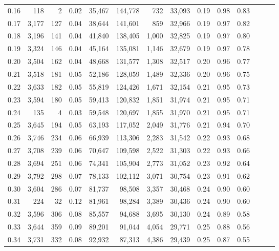 \begin{tabular}{rrrrrrrrrrrrrr}
0.16 &    118 &      2 &  0.02 &   35,467 &  144,778 &     732 &  33,093 &  0.19 &  0.98 &      0.83 \\
0.17 &  3,177 &    127 &  0.04 &   38,644 &  141,601 &     859 &  32,966 &  0.19 &  0.97 &      0.82 \\
0.18 &  3,196 &    141 &  0.04 &   41,840 &  138,405 &   1,000 &  32,825 &  0.19 &  0.97 &      0.80 \\
0.19 &  3,324 &    146 &  0.04 &   45,164 &  135,081 &   1,146 &  32,679 &  0.19 &  0.97 &      0.78 \\
0.20 &  3,504 &    162 &  0.04 &   48,668 &  131,577 &   1,308 &  32,517 &  0.20 &  0.96 &      0.77 \\
0.21 &  3,518 &    181 &  0.05 &   52,186 &  128,059 &   1,489 &  32,336 &  0.20 &  0.96 &      0.75 \\
0.22 &  3,633 &    182 &  0.05 &   55,819 &  124,426 &   1,671 &  32,154 &  0.21 &  0.95 &      0.73 \\
0.23 &  3,594 &    180 &  0.05 &   59,413 &  120,832 &   1,851 &  31,974 &  0.21 &  0.95 &      0.71 \\
0.24 &    135 &      4 &  0.03 &   59,548 &  120,697 &   1,855 &  31,970 &  0.21 &  0.95 &      0.71 \\
0.25 &  3,645 &    194 &  0.05 &   63,193 &  117,052 &   2,049 &  31,776 &  0.21 &  0.94 &      0.70 \\
0.26 &  3,746 &    234 &  0.06 &   66,939 &  113,306 &   2,283 &  31,542 &  0.22 &  0.93 &      0.68 \\
0.27 &  3,708 &    239 &  0.06 &   70,647 &  109,598 &   2,522 &  31,303 &  0.22 &  0.93 &      0.66 \\
0.28 &  3,694 &    251 &  0.06 &   74,341 &  105,904 &   2,773 &  31,052 &  0.23 &  0.92 &      0.64 \\
0.29 &  3,792 &    298 &  0.07 &   78,133 &  102,112 &   3,071 &  30,754 &  0.23 &  0.91 &      0.62 \\
0.30 &  3,604 &    286 &  0.07 &   81,737 &   98,508 &   3,357 &  30,468 &  0.24 &  0.90 &      0.60 \\
0.31 &    224 &     32 &  0.12 &   81,961 &   98,284 &   3,389 &  30,436 &  0.24 &  0.90 &      0.60 \\
0.32 &  3,596 &    306 &  0.08 &   85,557 &   94,688 &   3,695 &  30,130 &  0.24 &  0.89 &      0.58 \\
0.33 &  3,644 &    359 &  0.09 &   89,201 &   91,044 &   4,054 &  29,771 &  0.25 &  0.88 &      0.56 \\
0.34 &  3,731 &    332 &  0.08 &   92,932 &   87,313 &   4,386 &  29,439 &  0.25 &  0.87 &      0.55 \\

\end{tabular}
